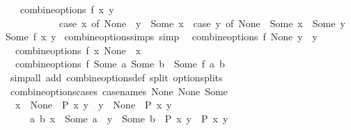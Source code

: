 \begin{isabellebody}
\ \ \ {\isachardoublequoteopen}combine{\isacharunderscore}{\kern0pt}options\ f\ x\ y\ {\isacharequal}{\kern0pt}\ \isanewline
\ \ \ \ \ \ \ \ \ \ \ {\isacharparenleft}{\kern0pt}case\ x\ of\ None\ {\isasymRightarrow}\ y\ {\isacharbar}{\kern0pt}\ Some\ x\ {\isasymRightarrow}\ {\isacharparenleft}{\kern0pt}case\ y\ of\ None\ {\isasymRightarrow}\ Some\ x\ {\isacharbar}{\kern0pt}\ Some\ y\ {\isasymRightarrow}\ Some\ {\isacharparenleft}{\kern0pt}f\ x\ y{\isacharparenright}{\kern0pt}{\isacharparenright}{\kern0pt}{\isacharparenright}{\kern0pt}{\isachardoublequoteclose}\isanewline
\isanewline
{}\isamarkupfalse%
\ combine{\isacharunderscore}{\kern0pt}options{\isacharunderscore}{\kern0pt}simps\ {\isacharbrackleft}{\kern0pt}simp{\isacharbrackright}{\kern0pt}{\isacharcolon}{\kern0pt}\isanewline
\ \ {\isachardoublequoteopen}combine{\isacharunderscore}{\kern0pt}options\ f\ None\ y\ {\isacharequal}{\kern0pt}\ y{\isachardoublequoteclose}\isanewline
\ \ {\isachardoublequoteopen}combine{\isacharunderscore}{\kern0pt}options\ f\ x\ None\ {\isacharequal}{\kern0pt}\ x{\isachardoublequoteclose}\isanewline
\ \ {\isachardoublequoteopen}combine{\isacharunderscore}{\kern0pt}options\ f\ {\isacharparenleft}{\kern0pt}Some\ a{\isacharparenright}{\kern0pt}\ {\isacharparenleft}{\kern0pt}Some\ b{\isacharparenright}{\kern0pt}\ {\isacharequal}{\kern0pt}\ Some\ {\isacharparenleft}{\kern0pt}f\ a\ b{\isacharparenright}{\kern0pt}{\isachardoublequoteclose}\isanewline
%
\isadelimproof
\ \ %
\endisadelimproof
%
\isatagproof
{}\isamarkupfalse%
\ {\isacharparenleft}{\kern0pt}simp{\isacharunderscore}{\kern0pt}all\ add{\isacharcolon}{\kern0pt}\ combine{\isacharunderscore}{\kern0pt}options{\isacharunderscore}{\kern0pt}def\ split{\isacharcolon}{\kern0pt}\ option{\isachardot}{\kern0pt}splits{\isacharparenright}{\kern0pt}%
\endisatagproof
{\isafoldproof}%
%
\isadelimproof
\isanewline
%
\endisadelimproof
\ \ \isanewline
{}\isamarkupfalse%
\ combine{\isacharunderscore}{\kern0pt}options{\isacharunderscore}{\kern0pt}cases\ {\isacharbrackleft}{\kern0pt}case{\isacharunderscore}{\kern0pt}names\ None{}\ None{}\ Some{\isacharbrackright}{\kern0pt}{\isacharcolon}{\kern0pt}\isanewline
\ \ {\isachardoublequoteopen}{\isacharparenleft}{\kern0pt}x\ {\isacharequal}{\kern0pt}\ None\ {\isasymLongrightarrow}\ P\ x\ y{\isacharparenright}{\kern0pt}\ {\isasymLongrightarrow}\ {\isacharparenleft}{\kern0pt}y\ {\isacharequal}{\kern0pt}\ None\ {\isasymLongrightarrow}\ P\ x\ y{\isacharparenright}{\kern0pt}\ {\isasymLongrightarrow}\ \isanewline
\ \ \ \ \ {\isacharparenleft}{\kern0pt}{\isasymAnd}a\ b{\isachardot}{\kern0pt}\ x\ {\isacharequal}{\kern0pt}\ Some\ a\ {\isasymLongrightarrow}\ y\ {\isacharequal}{\kern0pt}\ Some\ b\ {\isasymLongrightarrow}\ P\ x\ y{\isacharparenright}{\kern0pt}\ {\isasymLongrightarrow}\ P\ x\ y{\isachardoublequoteclose}\isanewline

\end{isabellebody}
